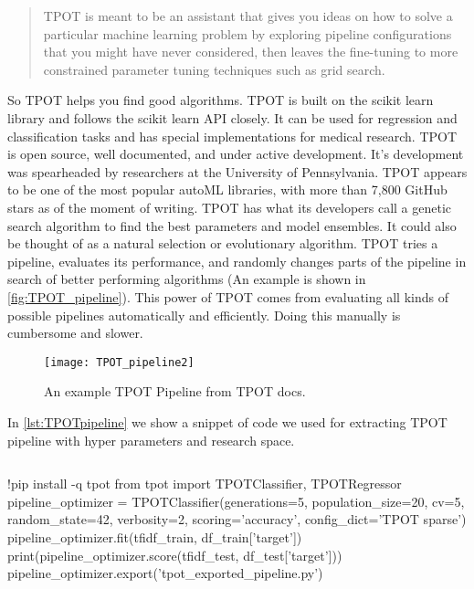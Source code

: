 \begin{quote}
	TPOT is meant to be an assistant that gives you ideas on how to solve a particular machine learning problem by exploring pipeline configurations that you might have never considered, then leaves the fine-tuning to more constrained parameter tuning techniques such as grid search.
\end{quote}
So TPOT helps you find good algorithms. TPOT is built on the scikit learn library and follows the scikit learn API closely. It can be used for regression and classification tasks and has special implementations for medical research.
TPOT is open source, well documented, and under active development. It’s development was spearheaded by researchers at the University of Pennsylvania. TPOT appears to be one of the most popular autoML libraries, with more than 7,800 GitHub stars as of the moment of writing.
TPOT has what its developers call a genetic search algorithm to find the best parameters and model ensembles. It could also be thought of as a natural selection or evolutionary algorithm. TPOT tries a pipeline, evaluates its performance, and randomly changes parts of the pipeline in search of better performing algorithms (An example is shown in \autoref{fig:TPOT_pipeline}).
This power of TPOT comes from evaluating all kinds of possible pipelines automatically and efficiently. Doing this manually is cumbersome and slower.

\begin{figure}[ht]
	\centering
	\texttt{[image: TPOT\_pipeline2]}
	\caption[Tree-based Pipeline Optimization Tool pipeline example]{An example TPOT Pipeline from TPOT docs.}
	\label{fig:TPOT_pipeline}
\end{figure}

In \autoref{lst:TPOTpipeline} we show a snippet of code we used for extracting TPOT pipeline with hyper parameters and research space. 


\begin{lstlisting}[frame=none,caption={TPOT pipeline generation.},captionpos=b,label=lst:TPOTpipeline]
\end{lstlisting}
\begin{python}	
	!pip install -q tpot
	from tpot import TPOTClassifier, TPOTRegressor
	pipeline_optimizer = TPOTClassifier(generations=5, population_size=20, cv=5,
	random_state=42, verbosity=2, scoring='accuracy', config_dict='TPOT sparse')
	pipeline_optimizer.fit(tfidf_train, df_train['target'])
	print(pipeline_optimizer.score(tfidf_test, df_test['target']))
	pipeline_optimizer.export('tpot_exported_pipeline.py')
\end{python}

